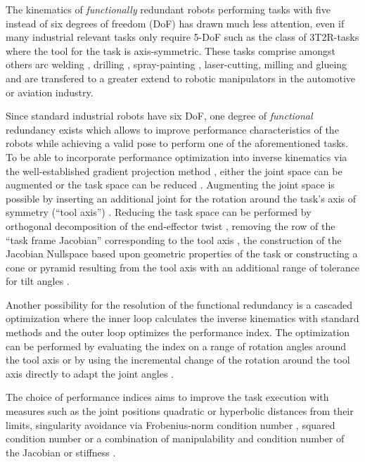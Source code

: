 \documentclass[twocolumn,10pt]{IFTOMM}
\begin{document}
The kinematics of \emph{functionally} redundant robots performing tasks with five instead of six degrees of freedom (DoF) has drawn much less attention, even if many industrial relevant tasks only require 5-DoF such as the class of 3T2R-tasks where the tool for the task is axis-symmetric.
These tasks comprise amongst others arc welding \cite{HuoBar2005}, drilling \cite{ZhuQuCaoYan2013,GuoDonKe2015}, spray-painting \cite{FromGra2010}, laser-cutting, milling and glueing and are transfered to a greater extend to robotic manipulators in the automotive or aviation industry.

Since standard industrial robots have six DoF, one degree of \emph{functional} redundancy exists which allows to improve performance characteristics of the robots while achieving a valid pose to perform one of the aforementioned tasks.
To be able to incorporate performance optimization into inverse kinematics via the well-established gradient projection method \cite{Yoshikawa1984}, either the joint space can be augmented or the task space can be reduced \cite{Huo2009}.
Augmenting the joint space is possible by inserting an additional joint for the rotation around the task's axis of symmetry (``tool axis'') \cite{Baron2000}.
Reducing the task space can be performed by orthogonal decomposition of the end-effector twist \cite{HuoBar2005}, removing the row of the ``task frame Jacobian'' corresponding to the tool axis \cite{Zlajpah2017}, the construction of the Jacobian Nullspace based upon geometric properties of the task \cite{LegerAng2016} or constructing a cone or pyramid resulting from the tool axis with an additional range of tolerance for tilt angles \cite{FromGra2010}.

Another possibility for the resolution of the functional redundancy is a cascaded optimization where the inner loop calculates the inverse kinematics with standard methods and the outer loop optimizes the performance index.
The optimization can be performed by evaluating the index on a range of rotation angles around the tool axis \cite{ZhuQuCaoYan2013} or by using the incremental change of the rotation around the tool axis directly to adapt the joint angles  \cite{GuoDonKe2015}.

The choice of performance indices aims to improve the task execution with measures such as the joint positions quadratic \cite{HuoBar2005} or hyperbolic \cite{ZhuQuCaoYan2013} distances from their limits, singularity avoidance via Frobenius-norm condition number \cite{ZhuQuCaoYan2013}, squared condition number \cite{LegerAng2016} or a combination of manipulability and condition number of the Jacobian \cite{HuoBar2008} or stiffness \cite{GuoDonKe2015}.
\end{document}
